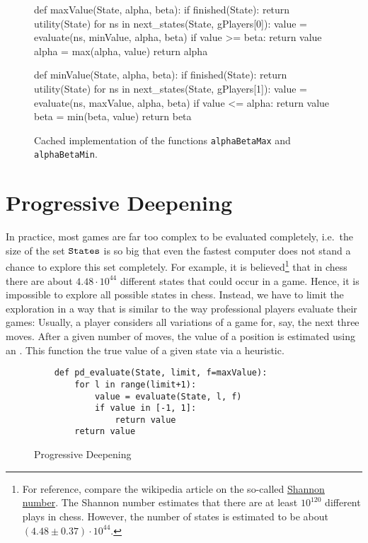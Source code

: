 \begin{figure}[!ht]
\centering
\begin{python3code}
def maxValue(State, alpha, beta):
    if finished(State):
        return utility(State)
    for ns in next_states(State, gPlayers[0]):
        value = evaluate(ns, minValue, alpha, beta)
        if value >= beta:
            return value
        alpha = max(alpha, value)
    return alpha

def minValue(State, alpha, beta):
    if finished(State):
        return utility(State)
    for ns in next_states(State, gPlayers[1]):
        value = evaluate(ns, maxValue, alpha, beta)
        if value <= alpha:
            return value
        beta = min(beta, value)
    return beta    
\end{python3code}
\vspace*{-0.3cm}
\caption{Cached implementation of the functions \texttt{alphaBetaMax} and \texttt{alphaBetaMin}.}
\label{fig:alphaBetaCached}
\end{figure}
\FloatBarrier

\section{Progressive Deepening}
In practice, most games are far too complex to be evaluated completely, i.e.~the size of the set
$\texttt{States}$ is so big that even the fastest computer does not stand a chance to explore this set
completely.  For example, it is believed\footnote{
  For reference, compare the wikipedia article on the so-called
  \href{https://en.wikipedia.org/wiki/Shannon_number}{Shannon number}.
  The Shannon number estimates that there are at least $10^{120}$ different plays in chess.  However, the
  number of states is estimated to be about $(4.48\pm 0.37) \cdot 10^{44}$. 
}
that in chess there are about $4.48 \cdot 10^{44}$ different states that could occur in a game.
Hence, it is impossible to explore all possible states in chess.  Instead, we have to limit
the exploration in a way that is similar to the way professional players evaluate their games:  Usually, a
player considers all variations of a game for, say, the next three moves.  After a given number of moves, the
value of a position is estimated using an .  This function  the true
value of a given state via a heuristic.

\begin{figure}[!ht]
\centering
\begin{verbatim}
    def pd_evaluate(State, limit, f=maxValue):
        for l in range(limit+1):
            value = evaluate(State, l, f)
            if value in [-1, 1]:
                return value
        return value
\end{verbatim}
\caption{Progressive Deepening}
\label{fig:Game.ipynb:pd_evaluate}
\end{figure}
\FloatBarrier


